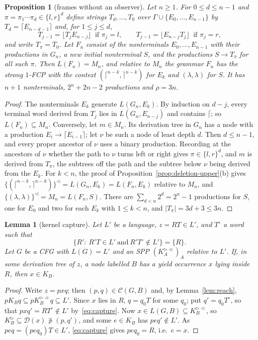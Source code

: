 \documentclass[11pt]{article}
\numberwithin{equation}{section}
\theoremstyle{plain}
\newtheorem{lemma}[theorem]{Lemma}
\newtheorem{proposition}[theorem]{Proposition}
\theoremstyle{definition}
\theoremstyle{remark}
\theoremstyle{plain}
\newcommand{\eps}{\lambda}
\newcommand{\R}{^{\rhd}}
\newcommand{\Lc}{^{\lhd}}
\newcommand{\RL}{^{\rhd\lhd}}
\newcommand{\D}{\mathcal D}
\newcommand{\Lfl}{\lfloor}
\newcommand{\Rfl}{\rfloor}
\newcommand{\Lce}{\lceil}
\newcommand{\Rce}{\rceil}
\begin{document}
\begin{proposition}[frames without an observer]\label{prop:untyped-frames}
Let $n\ge1$.  For $0\le d\le n-1$ and $\pi=\pi_1\cdots\pi_d\in\{l,r\}^d$ define
strings $T_d,\dots,T_0$ over $\Gamma\cup\{E_0,\dots,E_{n-1}\}$ by
$T_d=\Lce E_{n-d-1}\Rce$ and, for $1\le j\le d$,
\[
T_{j-1}=\Lfl T_jE_{n-j}\Rfl\ \text{ if }\pi_j=l,\qquad
T_{j-1}=\Lfl E_{n-j}T_j\Rfl\ \text{ if }\pi_j=r,
\]
and write $T_\pi=T_0$.  Let $F_n$ consist of the nonterminals
$E_0,\dots,E_{n-1}$ with their productions in $G_n$, a new initial
nonterminal $S$, and the productions $S\to T_\pi$ for all such $\pi$.  Then
$L(F_n)=M_n$, and relative to $M_n$ the grammar $F_n$ has the strong
$1$-FCP with the context $(\Lce^{n-k},\Rce^{n-k})$ for $E_k$ and
$(\eps,\eps)$ for $S$.  It has $n+1$ nonterminals, $2^n+2n-2$ productions and
$\rho=3n$.
\end{proposition}
\begin{proof}
The nonterminals $E_k$ generate $L(G_n,E_k)$.  By induction on $d-j$, every
terminal word derived from $T_j$ lies in $L(G_n,E_{n-j})$ and contains
$\Lce$; so $L(F_n)\subseteq M_n$.  Conversely, let $m\in M_n$.  Its
derivation tree in $G_n$ has a node with a production
$E_i\to\Lce E_{i-1}\Rce$; let $\nu$ be such a node of least depth $d$.  Then
$d\le n-1$, and every proper ancestor of $\nu$ uses a binary production.
Recording at the ancestors of $\nu$ whether the path to $\nu$ turns left or
right gives $\pi\in\{l,r\}^d$, and $m$ is derived from $T_\pi$, the subtrees
off the path and the subtree below $\nu$ being derived from the $E_k$.  For
$k<n$, the proof of Proposition~\ref{prop:deletion-upper}(b) gives
$\{(\Lce^{n-k},\Rce^{n-k})\}\Lc=L(G_n,E_k)=L(F_n,E_k)$ relative to $M_n$, and
$\{(\eps,\eps)\}\Lc=M_n=L(F_n,S)$.  There are $\sum_{d<n}2^d=2^n-1$ productions
for $S$, one for $E_0$ and two for each $E_k$ with $1\le k<n$, and
$|T_\pi|=3d+3\le3n$.
\end{proof}

\begin{lemma}[kernel capture]\label{lem:capture}
Let $L'$ be a language, $z=RT\in L'$, and $T^\circ$ a word such that
\begin{equation}\label{eq:capture}
\{R':\ R'T\in L'\ \text{and}\ R'T^\circ\notin L'\}=\{R\}.
\end{equation}
Let $G$ be a CFG with $L(G)=L'$ and an SPP $(K_A\RL)_A$ relative to $L'$.  If,
in some derivation tree of $z$, a node labelled $B$ has a yield occurrence
$x$ lying inside $R$, then $x\in K_B$.
\end{lemma}
\begin{proof}
Write $z=pxq$; then $(p,q)\in\mathcal C(G,B)$ and, by Lemma~\ref{lem:reach},
$pK_Bq\subseteq pK_B\RL q\subseteq L'$.  Since $x$ lies in $R$, $q=q_0T$ for
some $q_0$; put $q'=q_0T^\circ$, so that $pxq'=RT^\circ\notin L'$
by~\eqref{eq:capture}.  Now $x\in L(G,B)\subseteq K_B\RL$, so
$K_B\R\subseteq\D(x)\not\ni(p,q')$, and some $e\in K_B$ has $peq'\notin L'$.  As
$peq=(peq_0)T\in L'$, \eqref{eq:capture} gives $peq_0=R$, i.e.\ $e=x$.
\end{proof}
\end{document}
